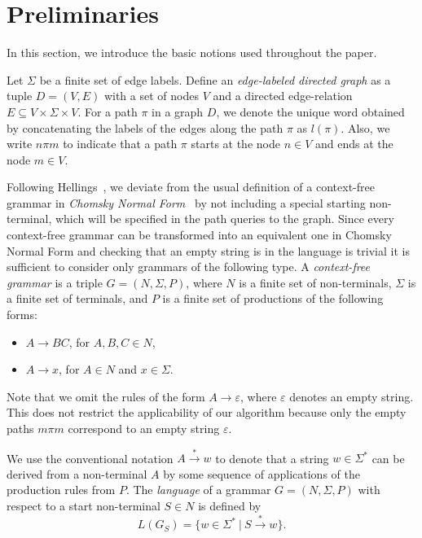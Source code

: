 \section{Preliminaries} \label{section_preliminaries}
In this section, we introduce the basic notions used throughout the paper.

Let $\Sigma$ be a finite set of edge labels. Define an \textit{edge-labeled directed graph} as a tuple $D = (V, E)$ with a set of nodes $V$ and a directed edge-relation $E \subseteq V \times \Sigma \times V$.  For a path $\pi$ in a graph $D$, we denote the unique word obtained by concatenating the labels of the edges along the path $\pi$ as $l(\pi)$. Also, we write $n \pi m$ to indicate that a path $\pi$ starts at the node $n \in V$ and ends at the node $m \in V$.

Following Hellings~\cite{hellingsRelational}, we deviate from the usual definition of a context-free grammar in \textit{Chomsky Normal Form}~\cite{chomsky} by not including a special starting non-terminal, which will be specified in the path queries to the graph. Since every context-free grammar can be transformed into an equivalent one in Chomsky Normal Form and checking that an empty string is in the language is trivial it is sufficient to consider only grammars of the following type. A \textit{context-free grammar} is a triple $G = (N, \Sigma, P)$, where $N$ is a finite set of non-terminals, $\Sigma$ is a finite set of terminals, and $P$ is a finite set of productions of the following forms:

\begin{itemize}
    \item $A \rightarrow B C$, for $A,B,C \in N$,
    \item $A \rightarrow x$, for $A \in N$ and $x \in \Sigma$.   
\end{itemize}

Note that we omit the rules of the form $A \rightarrow \varepsilon$, where $\varepsilon$ denotes an empty string. This does not restrict the applicability of our algorithm because only the empty paths $m \pi m$ correspond to an empty string $\varepsilon$.

We use the conventional notation $A \xrightarrow{*} w$ to denote that a string $w \in \Sigma^*$ can be derived from a non-terminal $A$ by some sequence of applications of the production rules from $P$. The \textit{language} of a grammar $G = (N,\Sigma,P)$ with respect to a start non-terminal $S \in N$ is defined by $$L(G_S) = \{w \in \Sigma^*~|~S \xrightarrow{*} w\}.$$

